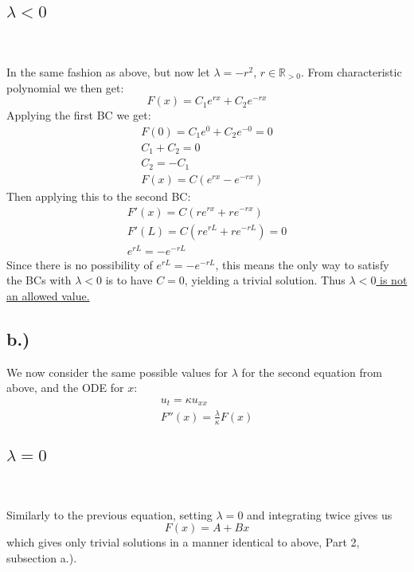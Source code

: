 \documentclass{article}
\begin{document}
\subsection*{$\lambda < 0$}~\\
\\
In the same fashion as above, but now let $\lambda = -r^2$, $r \in \mathbb{R}_{>0}$. From characteristic polynomial we then get:
\begin{equation}
F(x) = C_1e^{rx} + C_2e^{-rx}
\end{equation}
Applying the first BC we get:
\begin{equation}
\begin{aligned}
F(0) = C_1e^{0} + C_2e^{-0} = 0\\
C_1 + C_2 = 0\\
C_2 = - C_1\\
F(x) = C(e^{rx} - e^{-rx})
\end{aligned}
\end{equation}
Then applying this to the second BC:
\begin{equation}
\begin{aligned}
F'(x) = C(re^{rx} + re^{-rx})\\
F'(L) = C(re^{rL} + re^{-rL}) = 0\\
e^{rL} = -e^{-rL}
\end{aligned}
\end{equation}
Since there is no possibility of $e^{rL} = -e^{-rL}$, this means the only way to satisfy the BCs with $\lambda < 0$ is to have $C = 0$, yielding a trivial solution. Thus \underline{$\lambda < 0$ is not an allowed value.}
\subsection*{b.)}
We now consider the same possible values for $\lambda$ for the second equation from above, and the ODE for $x$:
\begin{equation}
\begin{aligned}
u_t = \kappa u_{xx}\\
F''(x) = \frac{\lambda}{\kappa} F(x)
\end{aligned}
\end{equation}
\subsection*{$\lambda = 0$}~\\
\\
Similarly to the previous equation, setting $\lambda = 0$ and integrating twice gives us
\begin{equation}
F(x) = A + Bx
\end{equation}
which gives only trivial solutions in a manner identical to above, Part 2, subsection a.).
\end{document}
